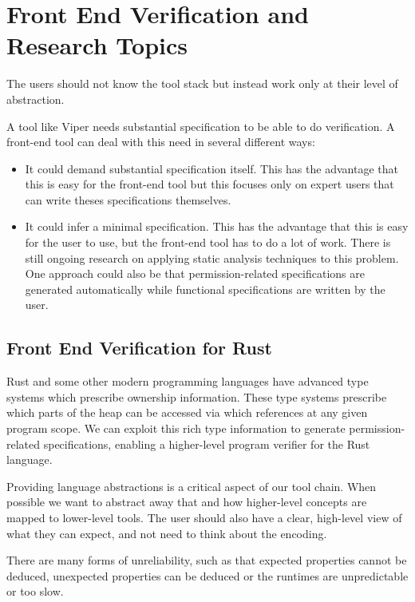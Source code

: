 \section{Front End Verification and Research Topics}
\begin{mytitle} The users should not know the tool stack but instead work only at their level of abstraction.
\end{mytitle}
\begin{mytitle} A tool like Viper needs substantial specification to be able to do verification. A front-end tool can deal with this need in several different ways: 
\begin{itemize}
    \item It could demand substantial specification itself. This has the advantage that this is easy for the front-end tool but this focuses only on expert users that can write theses specifications themselves.
    \item It could infer a minimal specification. This has the advantage that this is easy for the user to use, but the front-end tool has to do a lot of work. There is still ongoing research on applying static analysis techniques to this problem. One approach could also be that permission-related specifications are generated automatically while functional specifications are written by the user.
\end{itemize} 
\end{mytitle}
\subsection{Front End Verification for Rust}
\begin{mytitle} Rust and some other modern programming languages have advanced type systems which prescribe ownership information. These type systems prescribe which parts of the heap can be accessed via which references at any given program scope. We can exploit this rich type information to generate permission-related specifications, enabling a higher-level program verifier for the Rust language.
\end{mytitle}
\begin{mytitle} Providing language abstractions is a critical aspect of our tool chain. When possible we want to abstract away that and how higher-level concepts are mapped to lower-level tools. The user should also have a clear, high-level view of what they can expect, and not need to think about the encoding. 
\end{mytitle}
\begin{mytitle}[Unreliability] There are many forms of unreliability, such as that expected properties cannot be deduced, unexpected properties can be deduced or the runtimes are unpredictable or too slow. 
\end{mytitle}
